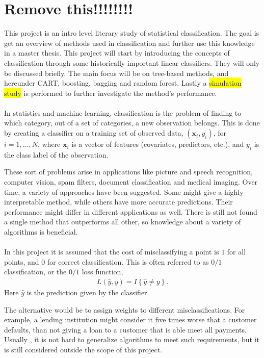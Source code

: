\section{Remove this!!!!!!!!}
\label{sec:Remove this!!!!!!!!}

This project is an intro level literary study of statistical classification. The goal is get an overview of methods used in classification and further use this knowledge in a master thesis. This project will start by introducing the concepts of classification through some historically important linear classifiers. They will only be discussed briefly. The main focus will be on tree-based methods, and hereunder CART, boosting, bagging and random forest. Lastly a \colorbox{yellow}{simulation study} is performed to further investigate the method's performance. 
\\
\\
In statistics and machine learning, classification is the problem of finding to which category, out of a set of categories, a new observation belongs. This is done by creating a classifier on a training set of observed data, $(\mathbf{x}_i, y_i)$, for $i = 1, \ldots, N$, where $\mathbf{x}_i$ is a vector of features (covariates, predictors, etc.), and $y_i$ is the class label of the observation. 

These sort of problems arise in applications like picture and speech recognition, computer vision, spam filters, document classification and medical imaging.
Over time, a variety of approaches have been suggested. Some might give a highly interpretable method, while others have more accurate predictions. Their performance might differ in different applications as well. There is still not found a single method that outperforms all other, so knowledge about a variety of algorithms is beneficial. 
\\
\\
In this project it is assumed that the cost of misclassifying a point is $1$ for all points, and $0$ for correct classification. This is often referred to as $0/1$ classification, or the $0/1$ loss function, 
\begin{align}
  L(\hat y, y) = I\left\{ \hat y \neq y \right\}.
\end{align}
Here $\hat y$ is the prediction given by the classifier. 

The alternative would be to assign weights to different misclassifications. For example, a lending institution might consider it five times worse that a customer defaults, than not giving a loan to a customer that is able meet all payments. Usually , it is not hard to generalize algorithms to meet such requirements, but it is still considered outside the scope of this project.

